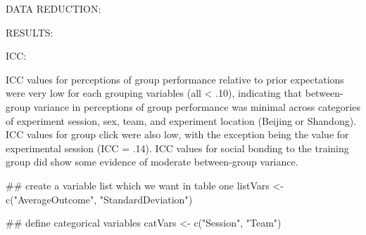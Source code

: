 DATA REDUCTION:









RESULTS:

ICC:







ICC values for perceptions of group performance relative to prior expectations were very low for each grouping variables (all < .10), indicating that between-group variance in perceptions of group performance was minimal across categories of experiment session, sex, team, and experiment location (Beijing or Shandong).  ICC values for group click were also low, with the exception being the value for experimental session (ICC = .14).
ICC values for social bonding to the training group did show some evidence of moderate between-group variance.

  ## create a variable list which we want in table one
  listVars <- c("AverageOutcome", "StandardDeviation")

  ## define categorical variables
  catVars <- c("Session", "Team")


